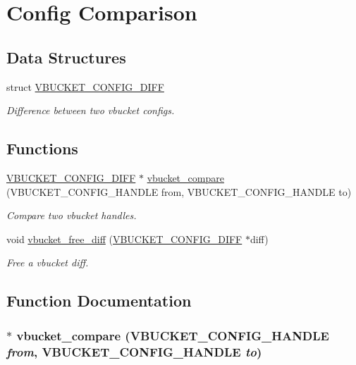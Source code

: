 \hypertarget{group__cfgcmp}{
\section{Config Comparison}
\label{group__cfgcmp}
}
\subsection*{Data Structures}
\begin{DoxyCompactItemize}
\item 
struct \hyperlink{struct_v_b_u_c_k_e_t___c_o_n_f_i_g___d_i_f_f}{VBUCKET\_\-CONFIG\_\-DIFF}
\begin{DoxyCompactList}\small\item\em Difference between two vbucket configs. \item\end{DoxyCompactList}\end{DoxyCompactItemize}
\subsection*{Functions}
\begin{DoxyCompactItemize}
\item 
\hyperlink{struct_v_b_u_c_k_e_t___c_o_n_f_i_g___d_i_f_f}{VBUCKET\_\-CONFIG\_\-DIFF} $\ast$ \hyperlink{group__cfgcmp_ga2724b8e3fccceb7e74f307b429b4c0f1}{vbucket\_\-compare} (VBUCKET\_\-CONFIG\_\-HANDLE from, VBUCKET\_\-CONFIG\_\-HANDLE to)
\begin{DoxyCompactList}\small\item\em Compare two vbucket handles. \item\end{DoxyCompactList}\item 
void \hyperlink{group__cfgcmp_gaec47fa8f2f15b56adc86cfd63b64b4ed}{vbucket\_\-free\_\-diff} (\hyperlink{struct_v_b_u_c_k_e_t___c_o_n_f_i_g___d_i_f_f}{VBUCKET\_\-CONFIG\_\-DIFF} $\ast$diff)
\begin{DoxyCompactList}\small\item\em Free a vbucket diff. \item\end{DoxyCompactList}\end{DoxyCompactItemize}


\subsection{Function Documentation}
\hypertarget{group__cfgcmp_ga2724b8e3fccceb7e74f307b429b4c0f1}{
\subsubsection[{vbucket\_\-compare}]{$\ast$ vbucket\_\-compare (VBUCKET\_\-CONFIG\_\-HANDLE {\em from}, \/  VBUCKET\_\-CONFIG\_\-HANDLE {\em to})}}
\label{group__cfgcmp_ga2724b8e3fccceb7e74f307b429b4c0f1}


